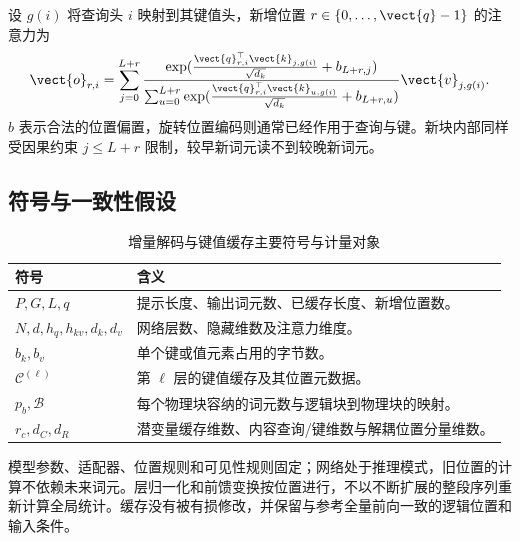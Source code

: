 \documentclass[../textbook.tex]{subfiles}
\begin{document}
设 $g(i)$ 将查询头 $i$ 映射到其键值头，新增位置 $r\in\{0,\ldots,\vect{q}-1\}$ 的注意力为
\begin{equation}
 \vect{o}_{r,i}=\sum_{j=0}^{L+r}
 \frac{\exp(\frac{\vect{q}_{r,i}^{\top}\vect{k}_{j,g(i)}}{\sqrt{d_k}}+b_{L+r,j})}
 {\sum_{u=0}^{L+r}\exp(\frac{\vect{q}_{r,i}^{\top}\vect{k}_{u,g(i)}}{\sqrt{d_k}}+b_{L+r,u})}
 \vect{v}_{j,g(i)}.
 \label{eq:cache-attn}
\end{equation}
$b$ 表示合法的位置偏置，旋转位置编码则通常已经作用于查询与键。新块内部同样受因果约束 $j\le L+r$ 限制，较早新词元读不到较晚新词元。

\subsection{符号与一致性假设}
\begin{table}[htbp]
\centering
\caption{增量解码与键值缓存主要符号与计量对象}
\label{tab:cache-symbols}
\begin{tabular}{ll}
\toprule 符号 & 含义\\\midrule
$P,G,L,q$ & 提示长度、输出词元数、已缓存长度、新增位置数。\\
$N,d,h_q,h_{kv},d_k,d_v$ & 网络层数、隐藏维数及注意力维度。\\
$b_k,b_v$ & 单个键或值元素占用的字节数。\\
$\mathcal C^{(\ell)}$ & 第 $\ell$ 层的键值缓存及其位置元数据。\\
$p_b,\mathcal B$ & 每个物理块容纳的词元数与逻辑块到物理块的映射。\\
$r_c,d_C,d_R$ & 潜变量缓存维数、内容查询/键维数与解耦位置分量维数。\\
\bottomrule
\end{tabular}
\end{table}

\begin{assumption}[缓存等价的条件]
模型参数、适配器、位置规则和可见性规则固定；网络处于推理模式，旧位置的计算不依赖未来词元。层归一化和前馈变换按位置进行，不以不断扩展的整段序列重新计算全局统计。缓存没有被有损修改，并保留与参考全量前向一致的逻辑位置和输入条件。
\end{assumption}
\end{document}
